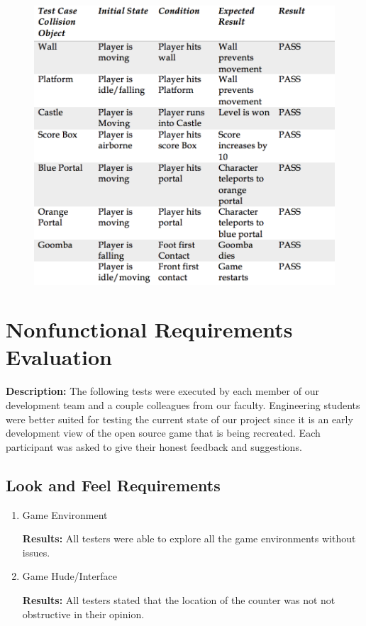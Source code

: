 \documentclass[12pt, titlepage]{article}
\begin{document}
\begin{figure}[H]
   \centering
   \includegraphics[scale=0.85]{Table2.png} %
   \label{fig:table2}
\end{figure}



\section{Nonfunctional Requirements Evaluation}

\textbf{Description:}
The following tests were executed by each member of our development team and a couple colleagues from our faculty. Engineering students were better suited for testing the current state of our project since it is an early development view of the open source game that is being recreated. Each participant was asked to give their honest feedback and suggestions.

\subsection{Look and Feel Requirements}

\begin{enumerate}

\item{Game Environment\\}

\textbf{Results: }All testers were able to explore all the game environments without issues.
					
\item{Game Hude/Interface\\}

\textbf{Results: }All testers stated that the location of the counter was not not obstructive in their opinion.

\end{enumerate}
\end{document}

